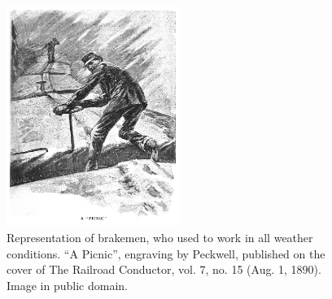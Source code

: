 \begin{figure}[b]
	\centering
	\includegraphics[width=0.5\textwidth]{assets/img/brakeman-peckwell-apicnic.jpg}
	\caption{Representation of brakemen, who used to work in all weather conditions.
	``A Picnic'', engraving by Peckwell, published on the cover of The Railroad Conductor, vol. 7, no. 15 (Aug. 1, 1890).
	Image in public domain.}%
	\label{fig:brakeman}
\end{figure}


